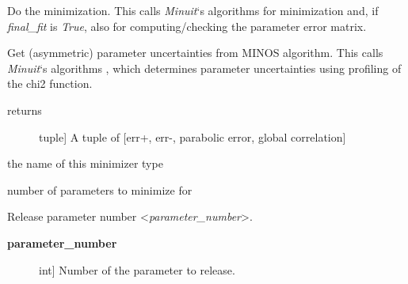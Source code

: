 \documentclass[a4paper,10pt,english]{sphinxmanual}
\begin{document}
\begin{fulllineitems}

\begin{fulllineitems}
\label{index:kafe.minuit.Minuit.minimize}
Do the minimization. This calls \emph{Minuit}`s algorithms 
for minimization and, if \emph{final\_fit} is \emph{True}, also 
for computing/checking the parameter error matrix.

\end{fulllineitems}


\begin{fulllineitems}
\label{index:kafe.minuit.Minuit.minos_errors}
Get (asymmetric) parameter uncertainties from MINOS
algorithm. This calls \emph{Minuit}`s algorithms ,
which determines parameter uncertainties using profiling
of the chi2 function.
\begin{description}
\item[{returns}] \leavevmode{[}tuple{]}
A tuple of {[}err+, err-, parabolic error, global correlation{]}

\end{description}

\end{fulllineitems}


\begin{fulllineitems}
\label{index:kafe.minuit.Minuit.name}
the name of this minimizer type

\end{fulllineitems}


\begin{fulllineitems}
\label{index:kafe.minuit.Minuit.number_of_parameters}
number of parameters to minimize for

\end{fulllineitems}


\begin{fulllineitems}
\label{index:kafe.minuit.Minuit.release_parameter}
Release parameter number \textless{}\emph{parameter\_number}\textgreater{}.
\begin{description}
\item[{\textbf{parameter\_number}}] \leavevmode{[}int{]}
Number of the parameter to release.


\end{description}
\end{fulllineitems}
\end{fulllineitems}
\end{document}
